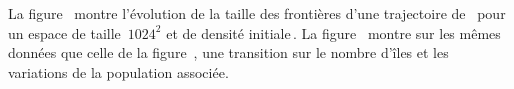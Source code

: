 \noindent%
La figure~ montre l'\'evolution de la taille
des fronti\`eres d'une trajectoire de~ pour un espace de
taille~$1024^2$ et de densit\'e initiale\,\undemi. %
La figure~ montre sur les m\^emes donn\'ees que
celle de la figure~, une transition sur le
nombre d'\^iles et les variations de la population associ\'ee. %

